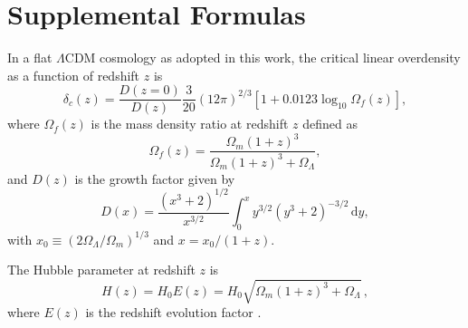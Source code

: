 \documentclass[twocolumn]{aastex62}
\newcommand{\R}[1]{\mathrm{#1}}
\newcommand{\D}[1]{\R{d} #1}
\newcommand{\lcdm}{$\Lambda$CDM}
\begin{document}
\appendix

\renewcommand\thetable{\thesection\arabic{table}}
\setcounter{table}{0}


\section{Supplemental Formulas}
\label{sec:formulas}

In a flat \lcdm{} cosmology as adopted in this work, the critical linear
overdensity as a function of redshift $z$ is \citep{kitayama1996,randall2002}
\begin{equation}
  \label{eq:delta-crit}
  \delta_c(z) = \frac{D(z=0)}{D(z)} \frac{3}{20} (12\pi)^{2/3}
    \left[1 + 0.0123 \log_{10} \Omega_f(z) \right],
\end{equation}
where $\Omega_f(z)$ is the mass density ratio at redshift $z$ defined as
\begin{equation}
  \label{eq:omega-fz}
  \Omega_f(z) = \frac{\Omega_m(1+z)^3}{\Omega_m(1+z)^3 + \Omega_{\Lambda}},
\end{equation}
and $D(z)$ is the growth factor given by \citep[equation~(13.6)]{peebles1980}
\begin{equation}
  \label{eq:growth-factor}
  D(x) = \frac{(x^3 + 2)^{1/2}}{x^{3/2}}
    \int_0^x y^{3/2} (y^3 + 2)^{-3/2} \,\D{y},
\end{equation}
with $x_0 \equiv (2\Omega_{\Lambda}/\Omega_m)^{1/3}$ and $x = x_0 / (1+z)$.

The Hubble parameter at redshift $z$ is
\begin{equation}
  \label{eq:hubble-z}
  H(z) = H_0 E(z) = H_0 \sqrt{\Omega_m(1+z)^3 + \Omega_{\Lambda}} \,,
\end{equation}
where $E(z)$ is the redshift evolution factor \citep{hogg1999}.
\end{document}
